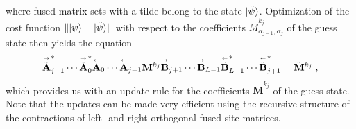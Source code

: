 \documentclass[a4paper, 12pt]{article}
\begin{document}
where fused matrix sets with a tilde belong to the state $\ket{\tilde \psi}$.
%
Optimization of the cost function $\lVert \ket{\psi} - \ket{\tilde{\psi}}\rVert$ with respect to the coefficients $\tilde{M}^{k_j}_{\alpha_{j-1},\alpha_j}$ of the guess state then yields the equation
\begin{equation}
	\overset{\shortrightarrow}{\tilde{\mathbf A}}^*_{j-1} \cdots \overset{\shortrightarrow}{\tilde{\mathbf A}}^*_{0} \overset{\shortleftarrow}{\mathbf A}_{0} \cdots \overset{\shortleftarrow}{\mathbf A}_{j-1} \mathbf M^{k_j} \overset{\shortrightarrow}{\mathbf{B}}_{j+1} \cdots \overset{\shortrightarrow}{\mathbf{B}}_{L-1}\overset{\shortleftarrow}{\tilde{\mathbf{B}}}^*_{L-1} \cdots \overset{\shortleftarrow}{\tilde{\mathbf{B}}}^*_{j+1}  = \tilde{\mathbf M}^{k_j} \; , \label{eq:update}
\end{equation}
which provides us with an update rule for the coefficients $\tilde{\mathbf M}^{k_j}$ of the guess state.
%
Note that the updates can be made very efficient using the recursive structure of the contractions of left- and right-orthogonal fused site matrices.
%
\end{document}
